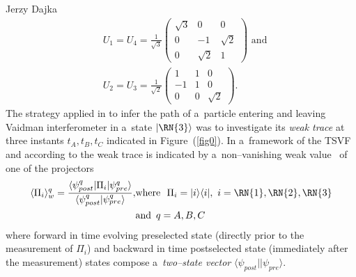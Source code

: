 \begin{artengenv}{Jerzy Dajka}
\begin{equation}\label{bs}
\begin{split}
&U_1 = U_4 =\frac{1}{\sqrt{3}}\left( \begin{array}{ccc} \sqrt{3} & 0 & 0 \\ 0 & -1 & \sqrt{2} \\ 0 & \sqrt{2} & 1  
\end{array}\right)\,\,  \mbox{and}\\%
&U_2 = U_3 =\frac{1}{\sqrt{2}}\left( \begin{array}{ccc} 1 & 1 & 0 \\ -1 & 1 & 0 \\ 0 & 0 & \sqrt{2}  
\end{array}\right)\!.
\end{split}
\end{equation}
The strategy applied in \parencite{PhysRevA.87.052104} to infer the path of a~particle entering  and leaving Vaidman interferometer  in a~state $|\RN{3}\rangle$  was to investigate its {\it weak trace}  at three instants $t_A,t_B,t_C$ indicated in Figure~(\ref{fig0}). In a~framework of the TSVF~\parencite{Aharonov2008} and according to \parencite{PhysRevA.87.052104} the weak trace is indicated by  a~non--vanishing weak value~\parencite{primus,PhysRevA.95.032110} of one of the  projectors
%
\begin{equation}\label{weak0}
\begin{split}
\langle\Pi_i\rangle_w^q=\frac{\langle\psi_{post}^q|\Pi_i|\psi_{pre}^q\rangle}{\langle \psi_{post}^q|\psi_{pre}^q\rangle},%
&\mbox{where}\,\,\,\,\Pi_i =  |i\rangle\langle i|,\,\, i=\RN{1},\RN{2},\RN{3} \\%
&\mbox{and} \,\,\, q=A,B,C 
\end{split} 
\end{equation}
where forward in time evolving preselected state (directly prior to the measurement of $\Pi_i$) and backward in time postselected state (immediately after the measurement) states compose  a~{\it two--state vector} $\langle\psi_{post}||\psi_{pre}\rangle$. 


\end{artengenv}

